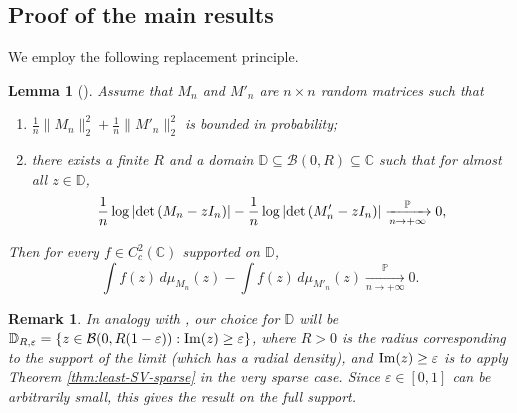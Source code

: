 \documentclass[11pt,oneside]{amsart}
\theoremstyle{plain}
\newtheorem{lemma}[theorem]{Lemma}
\newtheorem{remark}[theorem]{Remark}
\numberwithin{equation}{section}
\newcommand{\eps}{\varepsilon}
\newcommand{\p}{\mathbb{P}}
\newcommand{\pconv}{\xrightarrow[\textit{n} \to +\infty]{\quad \p \quad}}
\newcommand{\matrixx}{{M_n}}
\newcommand{\matrixxprime}{{M'_n}}
\begin{document}
\subsection{Proof of the main results}
We employ the following replacement principle. 
\begin{lemma}[{\cite[Lemma 8.1]{BasakCookZetouni}}] \label{thm:replacement}
Assume that $\matrixx$ and $\matrixxprime$ are $n \times n$ random matrices such that
\begin{enumerate}
    \item $\frac{1}{n}\|\matrixx\|_2^2 + \frac{1}{n}\|\matrixxprime\|_2^2$ is bounded in probability;
    \item there exists a finite $R$ and a domain $\mathbb{D} \subseteq \mathcal{B}(0,R)\subseteq \mathbb{C}$ such that for almost all ${z} \in \mathbb{D}$,
    \begin{equation}    \label{eq:log-determinant}
        \frac1n \log\left|{\rm det}\left(\matrixx-{z} I_n\right)\right|-\frac1n \log\left|{\rm det}\left(\matrixxprime-{z} I_n\right)\right| \pconv 0,
    \end{equation}
\end{enumerate}
Then for every $f \in C^2_c(\mathbb{C})$  supported on $\mathbb{D}$, 
\begin{equation}
    \int f(z) \,d\mu_{\matrixx}(z)- \int f(z)\, 
    d\mu_{\matrixxprime}(z) \pconv 0.
\end{equation}
\end{lemma}

\begin{remark}
    In analogy with \cite[Sec. 10]{BasakRudelson19}, our choice for $\mathbb{D}$ will be $\mathbb{D}_{R,\eps} = \{z \in \mathcal{B}(0,R(1-\eps)) : {\rm Im}(z)\ge \eps\}$, where $R>0$ is the radius corresponding to the support of the limit (which has a radial density), and ${\rm Im}(z)\ge \eps$ is to apply Theorem \ref{thm:least-SV-sparse} in the very sparse case. Since $\eps\in[0,1]$ can be arbitrarily small, this gives the result on the full support.
\end{remark}
\end{document}
